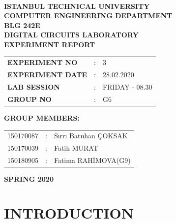 \documentclass[pdftex,12pt,a4paper]{article}
\begin{document}
\begin{titlepage}
\begin{center}
\textbf{}\\
\textbf{\Large{ISTANBUL TECHNICAL UNIVERSITY}}\\
\vspace{0.5cm}
\textbf{\Large{COMPUTER ENGINEERING DEPARTMENT}}\\
\vspace{2cm}
\textbf{\Large{BLG 242E\\ DIGITAL CIRCUITS LABORATORY\\ EXPERIMENT REPORT}}\\
\vspace{2.8cm}
\begin{table}[ht]
\centering
\Large{
\begin{tabular}{lcl}
\textbf{EXPERIMENT NO}  & : & 3 \\
\textbf{EXPERIMENT DATE}  & : & 28.02.2020 \\
\textbf{LAB SESSION}  & : & FRIDAY - 08.30 \\
\textbf{GROUP NO}  & : & G6 \\
\end{tabular}}
\end{table}
\vspace{1cm}
\textbf{\Large{GROUP MEMBERS:}}\\
\begin{table}[ht]
\centering
\Large{
\begin{tabular}{rcl}
150170087  & : & Sırrı Batuhan ÇOKSAK \\
150170039  & : & Fatih MURAT \\
150180905  & : & Fatima RAHİMOVA(G9) \\
\end{tabular}}
\end{table}
\vspace{2.8cm}
\textbf{\Large{SPRING 2020}}

\end{center}

\end{titlepage}

\thispagestyle{empty}
\setcounter{tocdepth}{4}
\tableofcontents
\clearpage

\setcounter{page}{1}

\section{INTRODUCTION}
\end{document}
